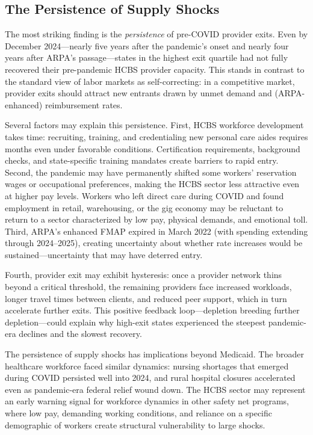 \documentclass[12pt]{article}
\begin{document}
\subsection{The Persistence of Supply Shocks}

The most striking finding is the \emph{persistence} of pre-COVID provider exits. Even by December 2024---nearly five years after the pandemic's onset and nearly four years after ARPA's passage---states in the highest exit quartile had not fully recovered their pre-pandemic HCBS provider capacity. This stands in contrast to the standard view of labor markets as self-correcting: in a competitive market, provider exits should attract new entrants drawn by unmet demand and (ARPA-enhanced) reimbursement rates.

Several factors may explain this persistence. First, HCBS workforce development takes time: recruiting, training, and credentialing new personal care aides requires months even under favorable conditions. Certification requirements, background checks, and state-specific training mandates create barriers to rapid entry. Second, the pandemic may have permanently shifted some workers' reservation wages or occupational preferences, making the HCBS sector less attractive even at higher pay levels. Workers who left direct care during COVID and found employment in retail, warehousing, or the gig economy may be reluctant to return to a sector characterized by low pay, physical demands, and emotional toll. Third, ARPA's enhanced FMAP expired in March 2022 (with spending extending through 2024--2025), creating uncertainty about whether rate increases would be sustained---uncertainty that may have deterred entry.

Fourth, provider exit may exhibit hysteresis: once a provider network thins beyond a critical threshold, the remaining providers face increased workloads, longer travel times between clients, and reduced peer support, which in turn accelerate further exits. This positive feedback loop---depletion breeding further depletion---could explain why high-exit states experienced the steepest pandemic-era declines and the slowest recovery.

The persistence of supply shocks has implications beyond Medicaid. The broader healthcare workforce faced similar dynamics: nursing shortages that emerged during COVID persisted well into 2024, and rural hospital closures accelerated even as pandemic-era federal relief wound down. The HCBS sector may represent an early warning signal for workforce dynamics in other safety net programs, where low pay, demanding working conditions, and reliance on a specific demographic of workers create structural vulnerability to large shocks.
\end{document}
